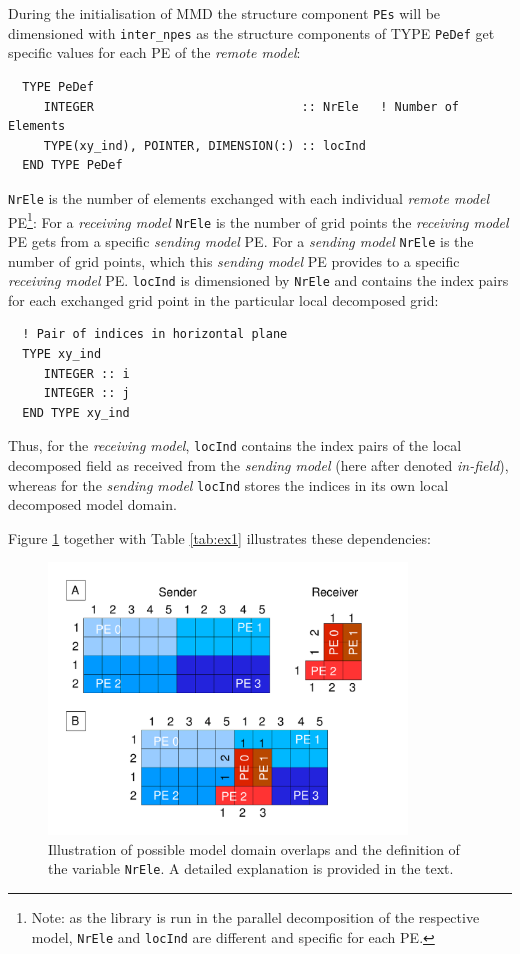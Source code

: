 \documentclass[twoside]{article}
\begin{document}
During the initialisation of MMD the structure component \verb|PEs| will be 
dimensioned with \verb|inter_npes| as the structure components of  
{\footnotesize TYPE} \verb|PeDef| get specific values for each PE of the 
{\it remote model}:
\begin{verbatim}
  TYPE PeDef
     INTEGER                             :: NrEle   ! Number of Elements 
     TYPE(xy_ind), POINTER, DIMENSION(:) :: locInd
  END TYPE PeDef
\end{verbatim}
 \verb|NrEle| is the number of elements 
exchanged with each individual {\it remote model} PE\footnote{Note: as the library is 
run in the parallel decomposition of the respective model, {\tt NrEle} and {\tt locInd} 
are different and specific for each PE.}:
 For a {\it receiving model} \verb|NrEle| is the number of grid points the
 {\it receiving model} PE gets from a specific {\it sending model} PE.
 For a {\it sending model} \verb|NrEle| is the number of grid 
points, which this {\it sending model} PE provides to a specific {\it
receiving model} PE. 
\verb|locInd| is dimensioned by \verb|NrEle| and contains the index pairs for
 each exchanged grid point in the particular local decomposed grid: 
\begin{verbatim}
  ! Pair of indices in horizontal plane
  TYPE xy_ind
     INTEGER :: i
     INTEGER :: j
  END TYPE xy_ind
\end{verbatim}
Thus, for the {\it receiving model}, \verb|locInd| contains the index
pairs of the local decomposed field as received from the {\it
sending model} (here after denoted {\it in-field}), whereas for the
{\it sending model} \verb|locInd| stores the indices in  
its own local decomposed model domain. 

Figure \ref{fig:MMD-NrEle} together with Table \ref{tab:ex1} illustrates these 
dependencies:
\begin{figure}
\begin{center} 
\includegraphics[width=0.85\textwidth]{MMDlib_NrEle.pdf} 
\end{center} 
\vspace*{-0.8cm}
\caption{Illustration of possible model domain overlaps and the definition
of the variable {\tt NrEle}. A detailed explanation is provided in the text.} 
\label{fig:MMD-NrEle} 
\end{figure} 
\end{document}
